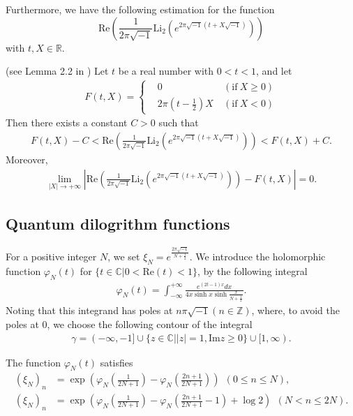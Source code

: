 \documentclass[12pt]{amsart}
\begin{document}
Furthermore, we have the following estimation for the function $$\text{Re}\left(\frac{1}{2\pi\sqrt{-1}}\text{Li}_2\left(e^{2\pi\sqrt{-1}(t+X\sqrt{-1})}\right)\right)$$ with $t,X\in \mathbb{R}$.   
\begin{lemma} (see Lemma 2.2 in \cite{OhtYok18}) \label{lemma-Li2}
    Let $t$ be a real number with $0<t<1$, and let
 \begin{align}
    F(t,X)=\left\{ \begin{aligned}
         &0  &  \ (\text{if} \ X\geq 0) \\
         &2\pi \left(t-\frac{1}{2}\right)X & \ (\text{if} \ X<0)
                          \end{aligned}\right.
                      \end{align}
    Then there exists a constant $C>0$ such that 
\begin{align}
    F(t,X)-C<\text{Re}\left(\frac{1}{2\pi\sqrt{-1}}\text{Li}_2\left(e^{2\pi\sqrt{-1}(t+X\sqrt{-1})}\right)\right)<
   F(t,X)+C.
\end{align}
Moreover, 
\begin{align}
\lim_{|X|\rightarrow +\infty}|\text{Re}\left(\frac{1}{2\pi\sqrt{-1}}\text{Li}_2\left(e^{2\pi\sqrt{-1}(t+X\sqrt{-1})}\right)\right)-F(t,X)|=0.    
\end{align}
\end{lemma}


\subsection{Quantum dilogrithm functions}
For a positive integer $N$, we set $\xi_N=e^{\frac{2\pi\sqrt{-1}}{N+\frac{1}{2}}}$. We introduce the holomorphic function $\varphi_N(t)$ for $\{t\in
\mathbb{C}| 0< \text{Re}(t) < 1\}$, by the following integral
\begin{align}
\varphi_N(t)=\int_{-\infty}^{+\infty}\frac{e^{(2t-1)x}dx}{4x \sinh x
\sinh\frac{x}{N+\frac{1}{2}}}.
\end{align}
Noting that this integrand has poles at $n\pi \sqrt{-1} (n\in
\mathbb{Z})$, where, to avoid the poles at $0$, we choose the
following contour of the integral
\begin{align}
\gamma=(-\infty,-1]\cup \{z\in \mathbb{C}||z|=1, \text{Im} z\geq 0\}
\cup [1,\infty).
\end{align}

\begin{lemma}  \label{lemma-varphixi}
The function $\varphi_N(t)$ satisfies 
\begin{align}
    (\xi_{N})_n&=\exp \left(\varphi_N\left(\frac{1}{2N+1}\right)-\varphi_N\left(\frac{2n+1}{2N+1}\right)\right)   \  \   \left(0\leq n\leq N\right), \\
    (\xi_{N})_n&=\exp \left(\varphi_N\left(\frac{1}{2N+1}\right)-\varphi_N\left(\frac{2n+1}{2N+1}-1\right)+\log 2\right)   \  \   \left(N< n\leq 2N\right).
\end{align}
\end{lemma}
\end{document}
